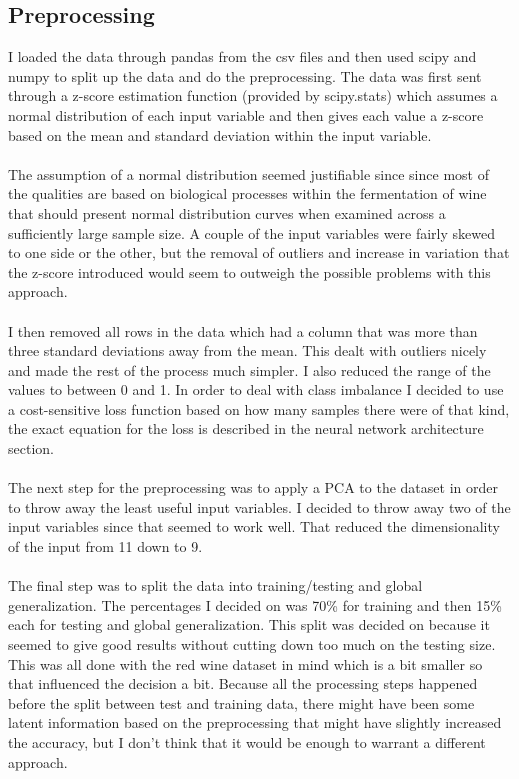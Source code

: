 \documentclass[conference]{IEEEtran}
\begin{document}
\subsection{Preprocessing}
I loaded the data through pandas from the csv files and then used scipy and numpy to split up the data and do the preprocessing.
The data was first sent through a z-score estimation function (provided by scipy.stats) which assumes a normal distribution of each input variable and then gives each value a z-score based on the mean and standard deviation within the input variable.
\\\\
The assumption of a normal distribution seemed justifiable since since most of the qualities are based on biological processes within the fermentation of wine that should present normal distribution curves when examined across a sufficiently large sample size. A couple of the input variables were fairly skewed to one side or the other, but the removal of outliers and increase in variation that the z-score introduced would seem to outweigh the possible problems with this approach.
\\\\
I then removed all rows in the data which had a column that was more than three standard deviations away from the mean. This dealt with outliers nicely and made the rest of the process much simpler. I also reduced the range of the values to between 0 and 1. In order to deal with class imbalance I decided to use a cost-sensitive loss function based on how many samples there were of that kind, the exact equation for the loss is described in the neural network architecture section.
\\\\
The next step for the preprocessing was to apply a PCA to the dataset in order to throw away the least useful input variables. I decided to throw away two of the input variables since that seemed to work well. That reduced the dimensionality of the input from 11 down to 9.
\\\\
The final step was to split the data into training/testing and global generalization. The percentages I decided on was 70\% for training and then 15\% each for testing and global generalization. This split was decided on because it seemed to give good results without cutting down too much on the testing size. This was all done with the red wine dataset in mind which is a bit smaller so that influenced the decision a bit. Because all the processing steps happened before the split between test and training data, there might have been some latent information based on the preprocessing that might have slightly increased the accuracy, but I don't think that it would be enough to warrant a different approach.
\end{document}
